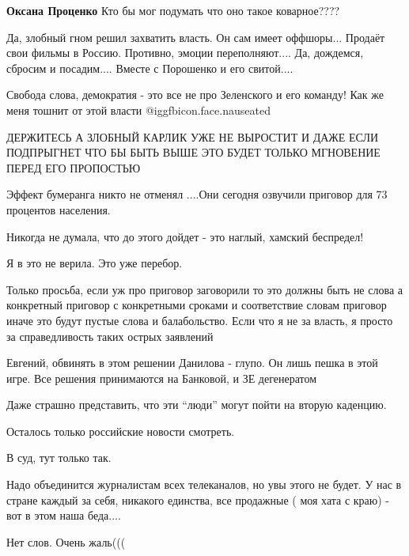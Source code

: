 \begin{itemize}
\textbf{Оксана Проценко} Кто бы мог подумать что оно такое коварное????


Да, злобный гном решил захватить власть. Он сам имеет оффшоры... Продаёт свои
фильмы в Россию. Противно, эмоции переполняют.... Да, дождемся, сбросим и
посадим.... Вместе с Порошенко и его свитой....


Свобода слова, демократия - это все не про Зеленского и его команду! Как же
меня тошнит от этой власти  @igg{fbicon.face.nauseated} 


ДЕРЖИТЕСЬ А ЗЛОБНЫЙ КАРЛИК УЖЕ НЕ ВЫРОСТИТ И ДАЖЕ ЕСЛИ ПОДПРЫГНЕТ ЧТО БЫ БЫТЬ
ВЫШЕ ЭТО БУДЕТ ТОЛЬКО МГНОВЕНИЕ ПЕРЕД ЕГО ПРОПОСТЬЮ

Эффект бумеранга никто не отменял ....Они сегодня озвучили приговор для 73 процентов населения.

Никогда не думала, что до этого дойдет - это наглый, хамский беспредел!

Я в это не верила. Это уже перебор.


Только просьба, если уж про приговор заговорили то это должны быть не слова а
конкретный приговор с конкретными сроками и соответствие словам приговор иначе
это будут пустые слова и балабольство. Если что я не за власть, я просто за
справедливость таких острых заявлений


Евгений, обвинять в этом решении Данилова - глупо. Он лишь пешка в этой игре.
Все решения принимаются на Банковой, и ЗЕ дегенератом

Даже страшно представить, что эти \enquote{люди} могут пойти на вторую каденцию.

Осталось только российские новости смотреть.

В суд, тут только так.


Надо объединится журналистам всех телеканалов, но увы этого не будет. У нас в
стране каждый за себя, никакого единства, все продажные ( моя хата с краю) -
вот в этом наша беда....

Нет слов. Очень жаль(((


\end{itemize}
